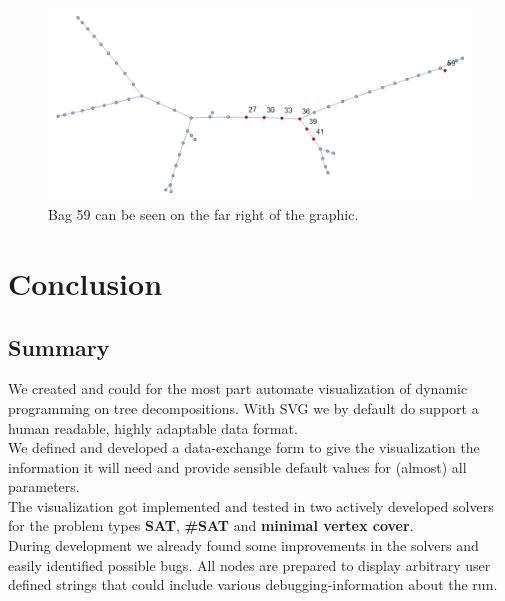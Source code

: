 \documentclass[a4paper, 12pt, bibliography=totoc]{scrartcl}
\begin{document}
\begin{figure}
	\centering
	\includegraphics[width=0.9\linewidth,height=0.9\textheight,keepaspectratio]{images/stars100var100.png}
	\caption{Bag 59 can be seen on the far right of the graphic.}
	\label{fig:bag59td}
\end{figure}
\newpage
\section{Conclusion}
\subsection{Summary}
We created and could for the most part automate visualization of dynamic programming on tree decompositions.
With SVG we by default do support a human readable, highly adaptable data format.\\

We defined and developed a data-exchange form to give the visualization the information it will need and provide sensible default values for (almost) all parameters.\\

The visualization got implemented and tested in two actively developed solvers for the problem types \textbf{SAT}, \textbf{\#SAT} and \textbf{minimal vertex cover}.\\

During development we already found some improvements in the solvers and easily identified possible bugs.
All nodes are prepared to display arbitrary user defined strings that could include various debugging-information about the run.
\end{document}
